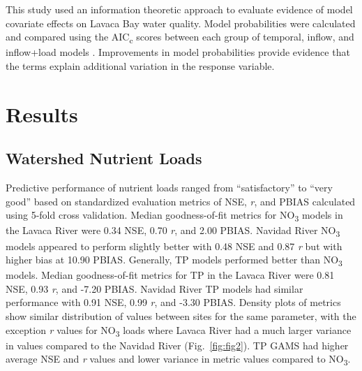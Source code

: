 \documentclass[fleqn,10pt,lineno]{wlpeerj} %
\begin{document}
This study used an information theoretic approach to evaluate evidence
of model covariate effects on Lavaca Bay water quality. Model
probabilities were calculated and compared using the
AIC\textsubscript{c} scores between each group of temporal, inflow, and
inflow+load models \autocite{burnhamAICModelSelection2011}. Improvements
in model probabilities provide evidence that the terms explain
additional variation in the response variable.

\hypertarget{results}{%
\section*{Results}\label{results}}

\hypertarget{watershed-nutrient-loads}{%
\subsection*{Watershed Nutrient Loads}\label{watershed-nutrient-loads}}

Predictive performance of nutrient loads ranged from ``satisfactory'' to
``very good'' based on standardized evaluation metrics of NSE, \emph{r},
and PBIAS \autocite{moriasiHydrologicWaterQuality2015} calculated using
5-fold cross validation. Median goodness-of-fit metrics for
NO\textsubscript{3} models in the Lavaca River were 0.34 NSE, 0.70
\emph{r}, and 2.00 PBIAS. Navidad River NO\textsubscript{3} models
appeared to perform slightly better with 0.48 NSE and 0.87 \emph{r} but
with higher bias at 10.90 PBIAS. Generally, TP models performed better
than NO\textsubscript{3} models. Median goodness-of-fit metrics for TP
in the Lavaca River were 0.81 NSE, 0.93 \emph{r}, and -7.20 PBIAS.
Navidad River TP models had similar performance with 0.91 NSE, 0.99
\emph{r}, and -3.30 PBIAS. Density plots of metrics show similar
distribution of values between sites for the same parameter, with the
exception \emph{r} values for NO\textsubscript{3} loads where Lavaca
River had a much larger variance in values compared to the Navidad River
(Fig.~\ref{fig:fig2}). TP GAMS had higher average NSE and \emph{r}
values and lower variance in metric values compared to
NO\textsubscript{3}.
\end{document}
